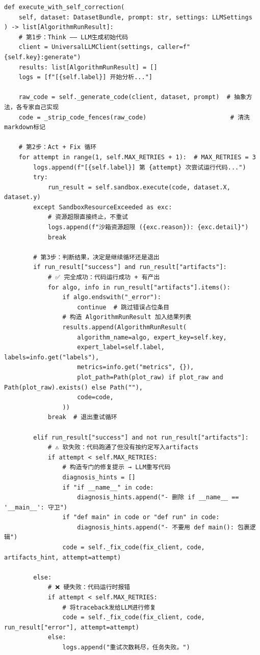 \documentclass[11pt,a4paper]{ctexbook}
\begin{document}
\begin{verbatim}
def execute_with_self_correction(
    self, dataset: DatasetBundle, prompt: str, settings: LLMSettings
) -> list[AlgorithmRunResult]:
    # 第1步：Think —— LLM生成初始代码
    client = UniversalLLMClient(settings, caller=f"{self.key}:generate")
    results: list[AlgorithmRunResult] = []
    logs = [f"[{self.label}] 开始分析..."]

    raw_code = self._generate_code(client, dataset, prompt)  # 抽象方法，各专家自己实现
    code = _strip_code_fences(raw_code)                       # 清洗markdown标记

    # 第2步：Act + Fix 循环
    for attempt in range(1, self.MAX_RETRIES + 1):  # MAX_RETRIES = 3
        logs.append(f"[{self.label}] 第 {attempt} 次尝试运行代码...")
        try:
            run_result = self.sandbox.execute(code, dataset.X, dataset.y)
        except SandboxResourceExceeded as exc:
            # 资源超限直接终止，不重试
            logs.append(f"沙箱资源超限 ({exc.reason}): {exc.detail}")
            break

        # 第3步：判断结果，决定是继续循环还是退出
        if run_result["success"] and run_result["artifacts"]:
            # ✅ 完全成功：代码运行成功 + 有产出
            for algo, info in run_result["artifacts"].items():
                if algo.endswith("_error"):
                    continue  # 跳过错误占位条目
                # 构造 AlgorithmRunResult 加入结果列表
                results.append(AlgorithmRunResult(
                    algorithm_name=algo, expert_key=self.key,
                    expert_label=self.label, labels=info.get("labels"),
                    metrics=info.get("metrics", {}),
                    plot_path=Path(plot_raw) if plot_raw and Path(plot_raw).exists() else Path(""),
                    code=code,
                ))
            break  # 退出重试循环

        elif run_result["success"] and not run_result["artifacts"]:
            # ⚠️ 软失败：代码跑通了但没有按约定写入artifacts
            if attempt < self.MAX_RETRIES:
                # 构造专门的修复提示 → LLM重写代码
                diagnosis_hints = []
                if "if __name__" in code:
                    diagnosis_hints.append("- 删除 if __name__ == '__main__': 守卫")
                if "def main" in code or "def run" in code:
                    diagnosis_hints.append("- 不要用 def main(): 包裹逻辑")
                code = self._fix_code(fix_client, code, artifacts_hint, attempt=attempt)

        else:
            # ❌ 硬失败：代码运行时报错
            if attempt < self.MAX_RETRIES:
                # 将traceback发给LLM进行修复
                code = self._fix_code(fix_client, code, run_result["error"], attempt=attempt)
            else:
                logs.append("重试次数耗尽，任务失败。")
\end{verbatim}
\end{document}
